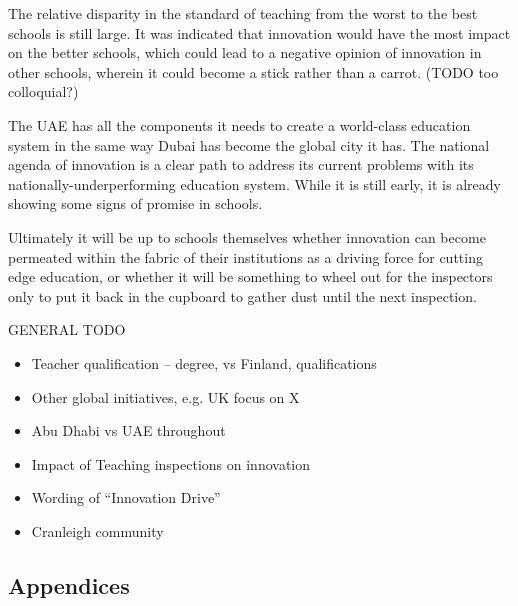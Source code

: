 The relative disparity in the standard of teaching from the worst to the best schools is still large. It was indicated that innovation would have the most impact on the better schools, which could lead to a negative opinion of innovation in other schools, wherein it could become a stick rather than a carrot. (TODO too colloquial?)

The UAE has all the components it needs to create a world-class education system in the same way Dubai has become the global city it has. The national agenda of innovation is a clear path to address its current problems with its nationally-underperforming education system. While it is still early, it is already showing some signs of promise in schools. 

Ultimately it will be up to schools themselves whether innovation can become permeated within the fabric of their institutions as a driving force for cutting edge education, or whether it will be something to wheel out for the inspectors only to put it back in the cupboard to gather dust until the next inspection.

GENERAL TODO
\begin{itemize}
\item Teacher qualification – degree, vs Finland, qualifications

\item Other global initiatives, e.g. UK focus on X
\item Abu Dhabi vs UAE throughout
\item Impact of Teaching inspections on innovation
\item Wording of “Innovation Drive”
\item Cranleigh community
\end{itemize}

\subsection{Appendices}

